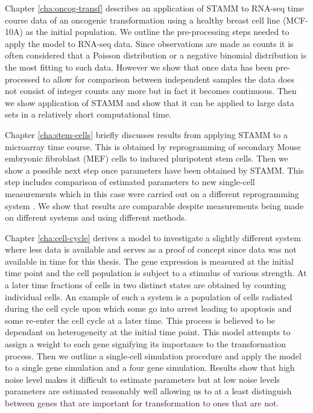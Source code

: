 Chapter \ref{cha:oncog-transf} describes an application of STAMM to RNA-seq time course data of an oncogenic transformation using a healthy breast cell line (MCF-10A) as the initial population. We outline the pre-processing steps needed to apply the model to RNA-seq data. Since observations are made as counts it is often considered that a Poisson distribution or a negative binomial distribution is the most fitting to such data. However we show that once data has been pre-processed to allow for comparison between independent samples the data does not consist of integer counts any more but in fact it becomes continuous. Then we show application of STAMM and show that it can be applied to large data sets in a relatively short computational time.

Chapter \ref{cha:stem-cells} briefly discusses results from applying STAMM to a microarray time course. This is obtained by  reprogramming of secondary Mouse embryonic fibroblast (MEF) cells to induced pluripotent stem cells. Then we show a possible next step once parameters have been obtained by STAMM. This step includes comparison of estimated parameters to new single-cell measurements which in this case were carried out on a different reprogramming system \citep{Buganim:2012hp}. We show that results are comparable despite measurements being made on different systems and using different methods.

Chapter \ref{cha:cell-cycle} derives a model to investigate a slightly different system where less data is available and serves as a proof of concept since data was not available in time for this thesis. The gene expression is measured at the initial time point and the cell population is subject to a stimulus of various strength. At a later time fractions of cells in two distinct states are obtained by counting individual cells. An example of such a system is a population of cells radiated during the cell cycle upon which some go into arrest leading to apoptosis and some re-enter the cell cycle at a later time. This process is believed to be dependant on heterogeneity at the initial time point. This model attempts to assign a weight to each gene signifying its importance to the transformation process. Then we outline a single-cell simulation procedure and apply the model to a single gene simulation and a four gene simulation. Results show that high noise level makes it difficult to estimate parameters but at low noise levels parameters are estimated reasonably well allowing us to at a least distinguish between genes that are important for transformation to ones that are not.

